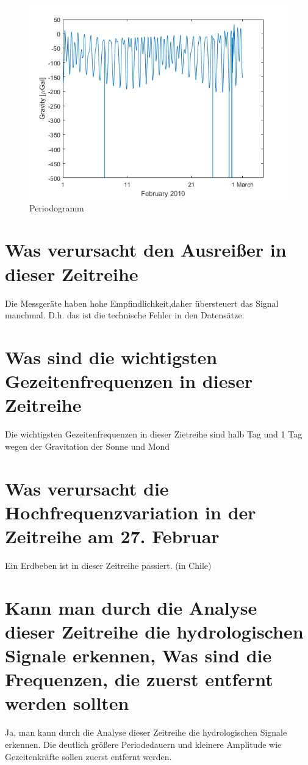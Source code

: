 \documentclass[12pt]{article}
\begin{document}
	\pagestyle{main}

\begin{figure}[ht]\centering
	\includegraphics[width=1\textwidth]{grav.png}
	\caption{Periodogramm}
\end{figure}
\section{Was verursacht den Ausreißer in dieser Zeitreihe}
Die Messgeräte haben hohe Empfindlichkeit,daher übersteuert das Signal manchmal. D.h. das ist die technische Fehler in den Datensätze.
\section{Was sind die wichtigsten Gezeitenfrequenzen in dieser Zeitreihe}
Die wichtigsten Gezeitenfrequenzen in dieser Zietreihe sind halb Tag und 1 Tag wegen der Gravitation der Sonne und Mond
\section{Was verursacht die Hochfrequenzvariation in der Zeitreihe am 27. Februar}
Ein Erdbeben ist in dieser Zeitreihe passiert. (in Chile)
\section{Kann man durch die Analyse dieser Zeitreihe die hydrologischen Signale erkennen, Was sind die Frequenzen, die zuerst entfernt werden sollten}
Ja, man kann durch die Analyse dieser Zeitreihe die hydrologischen Signale erkennen. Die deutlich größere Periodedauern und kleinere Amplitude wie Gezeitenkräfte sollen zuerst entfernt werden.
\end{document}
